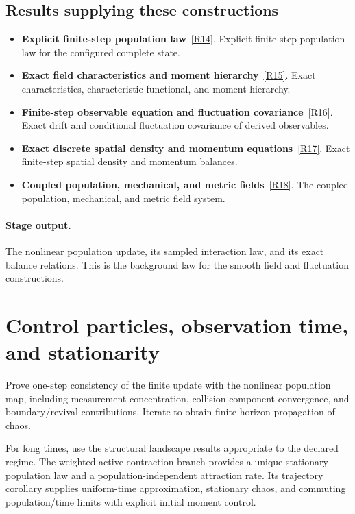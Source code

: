 \documentclass[11pt,a4paper]{article}
\begin{document}
\subsection*{Results supplying these constructions}
\begin{itemize}
\item \textbf{Explicit finite-step population law}~\hyperref[src:thm-algorithmic-explicit-transition]{[R14]}. Explicit finite-step population law for the configured complete state.
\item \textbf{Exact field characteristics and moment hierarchy}~\hyperref[src:thm-algorithmic-field-characteristics]{[R15]}. Exact characteristics, characteristic functional, and moment hierarchy.
\item \textbf{Finite-step observable equation and fluctuation covariance}~\hyperref[src:thm-algorithmic-observable-increment]{[R16]}. Exact drift and conditional fluctuation covariance of derived observables.
\item \textbf{Exact discrete spatial density and momentum equations}~\hyperref[src:thm-algorithmic-spatial-field-equations]{[R17]}. Exact finite-step spatial density and momentum balances.
\item \textbf{Coupled population, mechanical, and metric fields}~\hyperref[src:thm-algorithmic-coupled-field-system]{[R18]}. The coupled population, mechanical, and metric field system.
\end{itemize}
\paragraph{Stage output.} The nonlinear population update, its sampled interaction law, and its exact balance relations. This is the background law for the smooth field and fluctuation constructions.

\section{Control particles, observation time, and stationarity}
\label{stage:6}
Prove one-step consistency of the finite update with the nonlinear population map, including measurement concentration, collision-component convergence, and boundary/revival contributions. Iterate to obtain finite-horizon propagation of chaos.

For long times, use the structural landscape results appropriate to the declared regime. The weighted active-contraction branch provides a unique stationary population law and a population-independent attraction rate. Its trajectory corollary supplies uniform-time approximation, stationary chaos, and commuting population/time limits with explicit initial moment control.
\end{document}
